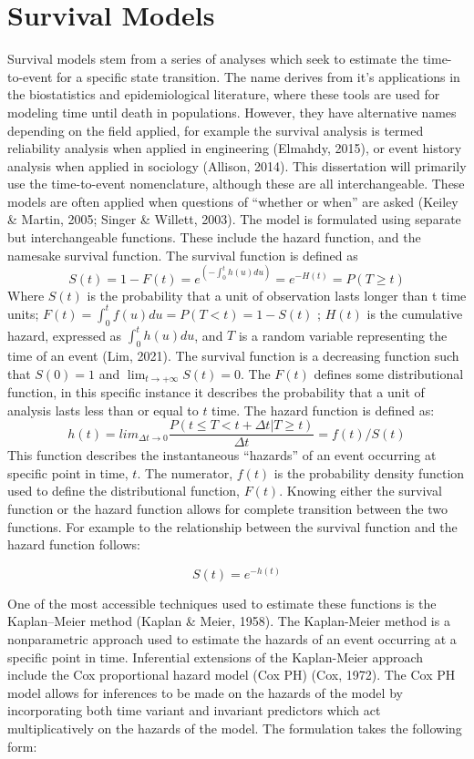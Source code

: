 \documentclass[12pt]{./styles/outhesis}
\begin{document}
\section{Survival Models}
Survival models stem from a series of analyses which seek to estimate
the time-to-event for a specific state transition. The name derives from
it's applications in the biostatistics and epidemiological literature,
where these tools are used for modeling time until death in populations.
However, they have alternative names depending on the field applied, for
example the survival analysis is termed reliability analysis when
applied in engineering (Elmahdy, 2015), or event history analysis when
applied in sociology (Allison, 2014). This dissertation will primarily
use the time-to-event nomenclature, although these are all
interchangeable. These models are often applied when questions of
``whether or when'' are asked (Keiley \& Martin, 2005; Singer \&
Willett, 2003). The model is formulated using separate but
interchangeable functions. These include the hazard function, and the
namesake survival function. The survival function is defined as
\[S(t) = 1 - F(t) = e^{(- \int_{0}^t h(u)du)} = e^{-H(t)} = P(T\geq t)\]
Where \(S(t)\) is the probability that a unit of observation lasts
longer than t time units;
\(F(t) = \int_{0}^{t} f(u) du = P(T < t) = 1-S(t)\) ; \(H(t)\) is the
cumulative hazard, expressed as \(\int_0^th(u)du\), and \(T\) is a
random variable representing the time of an event (Lim, 2021). The
survival function is a decreasing function such that \(S(0) =1\) and
\(\lim_{t\rightarrow+\infty}S(t)=0\). The \(F(t)\) defines some
distributional function, in this specific instance it describes the
probability that a unit of analysis lasts less than or equal to \(t\)
time. The hazard function is defined as:
\[h(t) = lim_{\Delta t \rightarrow0}\frac{P(t\leq T < t + \Delta t | T \geq t)}{\Delta t} = f(t)/S(t)\]
This function describes the instantaneous ``hazards'' of an event
occurring at specific point in time, \(t\). The numerator, \(f(t)\) is
the probability density function used to define the distributional
function, \(F(t)\). Knowing either the survival function or the hazard
function allows for complete transition between the two functions. For
example to the relationship between the survival function and the hazard
function follows:

\[
S(t) = e^{-h(t)}
\]

One of the most accessible techniques used to estimate these functions
is the Kaplan--Meier method (Kaplan \& Meier, 1958). The Kaplan-Meier
method is a nonparametric approach used to estimate the hazards of an
event occurring at a specific point in time. Inferential extensions of
the Kaplan-Meier approach include the Cox proportional hazard model (Cox
PH) (Cox, 1972). The Cox PH model allows for inferences to be made on
the hazards of the model by incorporating both time variant and
invariant predictors which act multiplicatively on the hazards of the
model. The formulation takes the following form:
\end{document}
